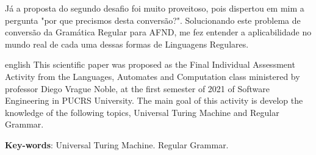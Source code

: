 \documentclass[
	article,			%
	11pt,				%
	oneside,			%
	a4paper,			%
	english,			%
	brazil,				%
	sumario=tradicional
	]{abntex2}
\begin{document}
    Já a proposta do segundo desafio foi muito proveitoso, pois dispertou em mim a pergunta "por que precismos desta conversão?". Solucionando este problema de conversão da Gramática Regular para AFND, me fez entender a aplicabilidade no mundo real de cada uma dessas formas de Linguagens Regulares.

\postextual



\emptythanks
\maketitle

\renewcommand{\resumoname}{Abstract}
\begin{resumoumacoluna}
 \begin{otherlanguage*}{english}
   This scientific paper was proposed as the Final Individual Assessment Activity from the Languages, Automates and Computation class ministered by professor Diego Vrague Noble, at the first semester of 2021 of Software Engineering in PUCRS University. The main goal of this activity is develop the knowledge of the following topics, Universal Turing Machine and Regular Grammar.  

   \vspace{\onelineskip}
 
   \noindent
   \textbf{Key-words}: Universal Turing Machine. Regular Grammar.
 \end{otherlanguage*}  
\end{resumoumacoluna}







%
%




\end{document}

